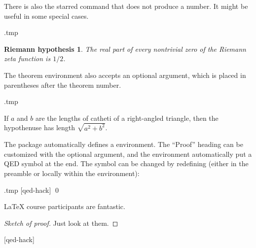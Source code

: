 There is also the starred  command that does not produce a number.
It might be useful in some special cases.
%
\begin{VerbatimOut}{\jobname.tmp}
\theoremstyle{plain}
\newtheorem*{riemannhyp}{Riemann hypothesis}

\begin{riemannhyp}
The real part of every nontrivial zero of the Riemann zeta function is $1/2$.
\end{riemannhyp}
\end{VerbatimOut}
\ShowExampleBelow


The theorem environment also accepts an optional argument,
which is placed in parentheses after the theorem number.
%
\begin{VerbatimOut}{\jobname.tmp}
\begin{theorem}[Pythagoras]
If $a$ and $b$ are the lengths of catheti of a right-angled triangle,
then the hypothenuse has length $\sqrt{a^2 + b^2}$.
\end{theorem}
\end{VerbatimOut}
\ShowExampleBelow


The  package automatically defines a  environment.
The ``Proof'' heading can be customized with the optional argument,
and the environment automatically put a QED symbol at the end.
The symbol can be changed by redefining 
(either in the preamble or locally within the environment):\label{ex:nasty qed hack}
%
\begin{VerbatimOut}{\jobname.tmp}
\DeclareCommandCopy{\oldqedsymbol}{\qedsymbol}
[qed-hack]{%
\renewcommand{\qedsymbol}{\oldqedsymbol}\qedsymbol{$\heartsuit$}\qed}

\begin{theorem}
\LaTeX{} course participants are fantastic.
\end{theorem}
\begin{proof}[Sketch of proof]
Just look at them.
\renewcommand{\qedsymbol}{$\heartsuit$}
\end{proof}
\end{VerbatimOut}
\ShowExampleBelow[9]
[qed-hack]

